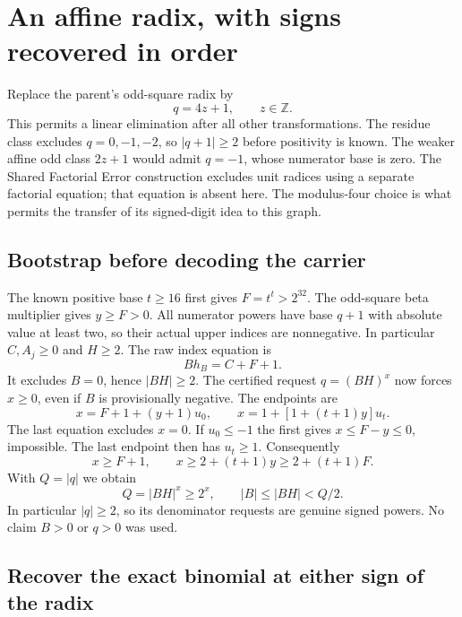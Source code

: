 \documentclass[11pt]{article}
\theoremstyle{definition}
\newcommand{\Z}{\mathbb Z}
\begin{document}
\section{An affine radix, with signs recovered in order}
\label{sec:radix}

Replace the parent's odd-square radix by
\begin{equation}\label{eq:radix}
q=4z+1,\qquad z\in\Z.
\end{equation}
This permits a linear elimination after all other transformations.
The residue class excludes $q=0,-1,-2$, so $|q+1|\ge2$ before
positivity is known. The weaker affine odd class $2z+1$ would admit
$q=-1$, whose numerator base is zero. The Shared Factorial Error
construction excludes unit radices using a separate factorial equation;
that equation is absent here. The modulus-four choice is what permits
the transfer of its signed-digit idea to this graph.

\subsection{Bootstrap before decoding the carrier}

The known positive base $t\ge16$ first gives $F=t^t>2^{32}$.
The odd-square beta multiplier gives $y\ge F>0$. All numerator
powers have base $q+1$ with absolute value at least two, so their
actual upper indices are nonnegative. In particular $C,A_j\ge0$
and $H\ge2$. The raw index equation is
\[
Bh_B=C+F+1.
\]
It excludes $B=0$, hence $|BH|\ge2$. The certified request
$q=(BH)^x$ now forces $x\ge0$, even if $B$ is provisionally negative.
The endpoints are
\begin{equation}\label{eq:endpoints}
x=F+1+(y+1)u_0,\qquad
x=1+[1+(t+1)y]u_t.
\end{equation}
The last equation excludes $x=0$. If $u_0\le-1$ the first gives
$x\le F-y\le0$, impossible. The last endpoint then has $u_t\ge1$.
Consequently
\begin{equation}\label{eq:amplifier}
x\ge F+1,\qquad x\ge2+(t+1)y\ge2+(t+1)F.
\end{equation}
With $Q=|q|$ we obtain
\[
Q=|BH|^x\ge2^x,\qquad |B|\le|BH|<Q/2.
\]
In particular $|q|\ge2$, so its denominator requests are genuine
signed powers. No claim $B>0$ or $q>0$ was used.

\subsection{Recover the exact binomial at either sign of the radix}
\end{document}
